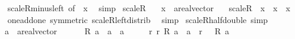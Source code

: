 \begin{isabellebody}
%
\isadelimproof
\ \ %
\endisadelimproof
%
\isatagproof
{}\isamarkupfalse%
\ scaleR{\isacharunderscore}{\kern0pt}minus{\isacharunderscore}{\kern0pt}left\ {\isacharbrackleft}{\kern0pt}of\ {}\ x{\isacharbrackright}{\kern0pt}\ \isamarkupfalse%
\ simp%
\endisatagproof
{\isafoldproof}%
%
\isadelimproof
\isanewline
%
\endisadelimproof
\isanewline
{}\isamarkupfalse%
\ scaleR{\isacharunderscore}{\kern0pt}{}{\isacharcolon}{\kern0pt}\isanewline
\ \ \ x\ {\isacharcolon}{\kern0pt}{\isacharcolon}{\kern0pt}\ {\isachardoublequoteopen}{\isacharprime}{\kern0pt}a{\isacharcolon}{\kern0pt}{\isacharcolon}{\kern0pt}real{\isacharunderscore}{\kern0pt}vector{\isachardoublequoteclose}\isanewline
\ \ \ {\isachardoublequoteopen}scaleR\ {}\ x\ {\isacharequal}{\kern0pt}\ x\ {\isacharplus}{\kern0pt}\ x{\isachardoublequoteclose}\isanewline
%
\isadelimproof
\ \ %
\endisadelimproof
%
\isatagproof
{}\isamarkupfalse%
\ one{\isacharunderscore}{\kern0pt}add{\isacharunderscore}{\kern0pt}one\ {\isacharbrackleft}{\kern0pt}symmetric{\isacharbrackright}{\kern0pt}\ scaleR{\isacharunderscore}{\kern0pt}left{\isacharunderscore}{\kern0pt}distrib\ \isamarkupfalse%
\ simp%
\endisatagproof
{\isafoldproof}%
%
\isadelimproof
\isanewline
%
\endisadelimproof
\isanewline
{}\isamarkupfalse%
\ scaleR{\isacharunderscore}{\kern0pt}half{\isacharunderscore}{\kern0pt}double\ {\isacharbrackleft}{\kern0pt}simp{\isacharbrackright}{\kern0pt}{\isacharcolon}{\kern0pt}\isanewline
\ \ \ a\ {\isacharcolon}{\kern0pt}{\isacharcolon}{\kern0pt}\ {\isachardoublequoteopen}{\isacharprime}{\kern0pt}a{\isacharcolon}{\kern0pt}{\isacharcolon}{\kern0pt}real{\isacharunderscore}{\kern0pt}vector{\isachardoublequoteclose}\isanewline
\ \ \ {\isachardoublequoteopen}{\isacharparenleft}{\kern0pt}{}\ {\isacharslash}{\kern0pt}\ {}{\isacharparenright}{\kern0pt}\ {\isacharasterisk}{\kern0pt}\isactrlsub R\ {\isacharparenleft}{\kern0pt}a\ {\isacharplus}{\kern0pt}\ a{\isacharparenright}{\kern0pt}\ {\isacharequal}{\kern0pt}\ a{\isachardoublequoteclose}\isanewline
%
\isadelimproof
%
\endisadelimproof
%
\isatagproof
{}\isamarkupfalse%
\ {\isacharminus}{\kern0pt}\isanewline
\ \ \isamarkupfalse%
\ {\isachardoublequoteopen}{\isasymAnd}r{\isachardot}{\kern0pt}\ r\ {\isacharasterisk}{\kern0pt}\isactrlsub R\ {\isacharparenleft}{\kern0pt}a\ {\isacharplus}{\kern0pt}\ a{\isacharparenright}{\kern0pt}\ {\isacharequal}{\kern0pt}\ {\isacharparenleft}{\kern0pt}r\ {\isacharasterisk}{\kern0pt}\ {}{\isacharparenright}{\kern0pt}\ {\isacharasterisk}{\kern0pt}\isactrlsub R\ a{\isachardoublequoteclose}\isanewline

\end{isabellebody}
